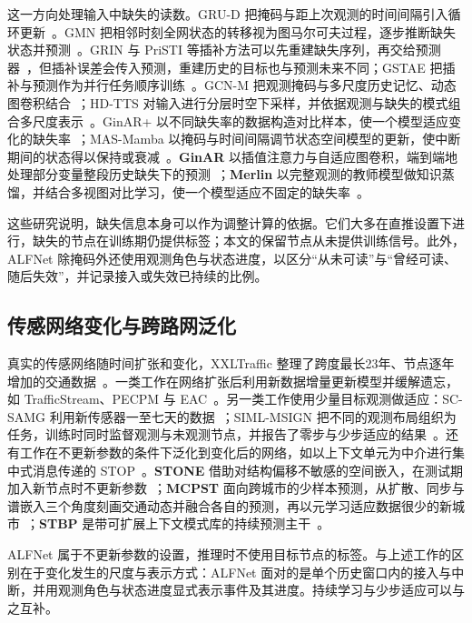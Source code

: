 这一方向处理输入中缺失的读数。GRU-D 把掩码与距上次观测的时间间隔引入循环更新~\citep{che2018recurrent}。GMN 把相邻时刻全网状态的转移视为图马尔可夫过程，逐步推断缺失状态并预测~\citep{cui2020graph}。GRIN 与 PriSTI 等插补方法可以先重建缺失序列，再交给预测器~\citep{cini2022filling,liu2023pristi}，但插补误差会传入预测，重建历史的目标也与预测未来不同；GSTAE 把插补与预测作为并行任务顺序训练~\citep{wang2023traffic}。GCN-M 把观测掩码与多尺度历史记忆、动态图卷积结合~\citep{zuo2023graph}；HD-TTS 对输入进行分层时空下采样，并依据观测与缺失的模式组合多尺度表示~\citep{marisca2024graph}。GinAR+ 以不同缺失率的数据构造对比样本，使一个模型适应变化的缺失率~\citep{yu2025ginarplus}；MAS-Mamba 以掩码与时间间隔调节状态空间模型的更新，使中断期间的状态得以保持或衰减~\citep{huang2026masmamba}。\textbf{GinAR} 以插值注意力与自适应图卷积，端到端地处理部分变量整段历史缺失下的预测~\citep{yu2024ginar}；\textbf{Merlin} 以完整观测的教师模型做知识蒸馏，并结合多视图对比学习，使一个模型适应不固定的缺失率~\citep{yu2025merlin}。

这些研究说明，缺失信息本身可以作为调整计算的依据。它们大多在直推设置下进行，缺失的节点在训练期仍提供标签；本文的保留节点从未提供训练信号。此外，ALFNet 除掩码外还使用观测角色与状态进度，以区分“从未可读”与“曾经可读、随后失效”，并记录接入或失效已持续的比例。

\subsection{传感网络变化与跨路网泛化}\label{sec:2_3}

真实的传感网络随时间扩张和变化，XXLTraffic 整理了跨度最长23年、节点逐年增加的交通数据~\citep{yin2025xxltraffic}。一类工作在网络扩张后利用新数据增量更新模型并缓解遗忘，如 TrafficStream、PECPM 与 EAC~\citep{chen2021trafficstream,wang2023pattern,chen2025expand}。另一类工作使用少量目标观测做适应：SC-SAMG 利用新传感器一至七天的数据~\citep{wang2026cold}；SIML-MSIGN 把不同的观测布局组织为任务，训练时同时监督观测与未观测节点，并报告了零步与少步适应的结果~\citep{zhao2026structure}。还有工作在不更新参数的条件下泛化到变化后的网络，如以上下文单元为中介进行集中式消息传递的 STOP~\citep{ma2025robust}。\textbf{STONE} 借助对结构偏移不敏感的空间嵌入，在测试期加入新节点时不更新参数~\citep{wang2024stone}；\textbf{MCPST} 面向跨城市的少样本预测，从扩散、同步与谱嵌入三个角度刻画交通动态并融合各自的预测，再以元学习适应数据很少的新城市~\citep{fofanah2026pimcst}；\textbf{STBP} 是带可扩展上下文模式库的持续预测主干~\citep{liu2026general}。

ALFNet 属于不更新参数的设置，推理时不使用目标节点的标签。与上述工作的区别在于变化发生的尺度与表示方式：ALFNet 面对的是单个历史窗口内的接入与中断，并用观测角色与状态进度显式表示事件及其进度。持续学习与少步适应可以与之互补。

